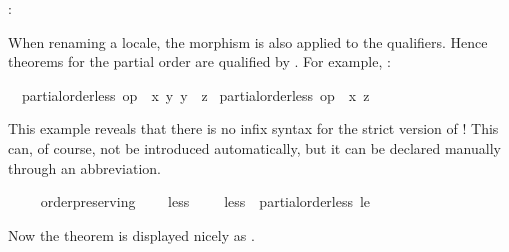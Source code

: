 \begin{isabellebody}
\begin{isamarkuptext}
  : %
\end{isamarkuptext}%
\isamarkuptrue%
%
\begin{isamarkuptext}%
When renaming a locale, the morphism is also applied
  to the qualifiers.  Hence theorems for the partial order \isa{{\isasympreceq}}
  are qualified by .  For example, : \begin{isabelle}%
\ \ {\isasymlbrakk}partial{\isacharunderscore}order{\isachardot}less\ op\ {\isasympreceq}\ {\isacharquery}x\ {\isacharquery}y{\isacharsemicolon}\ {\isacharquery}y\ {\isasympreceq}\ {\isacharquery}z{\isasymrbrakk}\isanewline
\isaindent{\ \ }{\isasymLongrightarrow}\ partial{\isacharunderscore}order{\isachardot}less\ op\ {\isasympreceq}\ {\isacharquery}x\ {\isacharquery}z%
\end{isabelle}%
\end{isamarkuptext}%
\isamarkuptrue%
%
\isadeliminvisible
%
\endisadeliminvisible
%
\isataginvisible
{}\isamarkupfalse%
%
\endisataginvisible
{\isafoldinvisible}%
%
\isadeliminvisible
%
\endisadeliminvisible
%
\begin{isamarkuptext}%
This example reveals that there is no infix syntax for the strict
  version of \isa{{\isasympreceq}}!  This can, of course, not be introduced
  automatically, but it can be declared manually through an abbreviation.%
\end{isamarkuptext}%
\isamarkuptrue%
\ \ \isamarkupfalse%
\ {\isacharparenleft}\ order{\isacharunderscore}preserving{\isacharparenright}\isanewline
\ \ \ \ less{\isacharprime}\ {\isacharparenleft}\ {\isachardoublequoteopen}{\isasymprec}{\isachardoublequoteclose}\ {}{}{\isacharparenright}\ \ {\isachardoublequoteopen}less{\isacharprime}\ {\isasymequiv}\ partial{\isacharunderscore}order{\isachardot}less\ le{\isacharprime}{\isachardoublequoteclose}%
\begin{isamarkuptext}%
Now the theorem is displayed nicely as
  .%
\end{isamarkuptext}%

\end{isabellebody}
